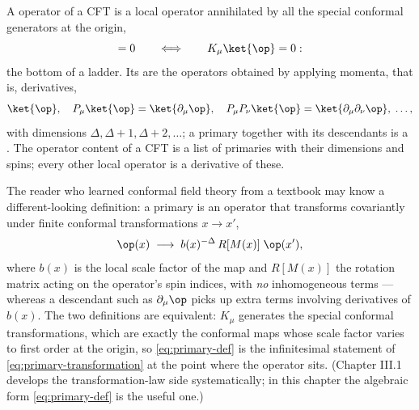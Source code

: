 \begin{ddefinition}
\label{def:primary}
A  operator of a CFT is a local operator annihilated by all
the special conformal generators at the origin,
\begin{equation}
[K_\mu,\, \op(0)] = 0
\qquad\Longleftrightarrow\qquad
K_\mu \ket{\op} = 0 :
\label{eq:primary-def}
\end{equation}
the bottom of a ladder. Its  are the operators obtained
by applying momenta, that is, derivatives,
\begin{equation}
\ket{\op}, \quad P_\mu \ket{\op} = \ket{\partial_\mu \op}, \quad
P_\mu P_\nu \ket{\op} = \ket{\partial_\mu \partial_\nu \op}, \;\dots,
\end{equation}
with dimensions $\Delta, \Delta + 1, \Delta + 2, \dots$; a primary together
with its descendants is a . The operator content
of a CFT is a list of primaries with their dimensions and spins; every
other local operator is a derivative of these.
\end{ddefinition}

\noin The reader who learned conformal field theory from a textbook may know
a different-looking definition: a primary is an operator that transforms
covariantly under finite conformal transformations $x \to x'$,
\begin{equation}
\op(x) \;\longrightarrow\; b(x)^{-\Delta}\, R[M(x)]\; \op(x'),
\label{eq:primary-transformation}
\end{equation}
where $b(x)$ is the local scale factor of the map and $R[M(x)]$ the rotation
matrix acting on the operator's spin indices, with \emph{no} inhomogeneous
terms --- whereas a descendant such as $\partial_\mu \op$ picks up extra
terms involving derivatives of $b(x)$. The two definitions are equivalent:
$K_\mu$ generates the special conformal transformations, which are exactly
the conformal maps whose scale factor varies to first order at the origin,
so \eqref{eq:primary-def} is the infinitesimal statement of
\eqref{eq:primary-transformation} at the point where the operator sits.
(Chapter III.1 develops the transformation-law side systematically; in this
chapter the algebraic form \eqref{eq:primary-def} is the useful one.)

